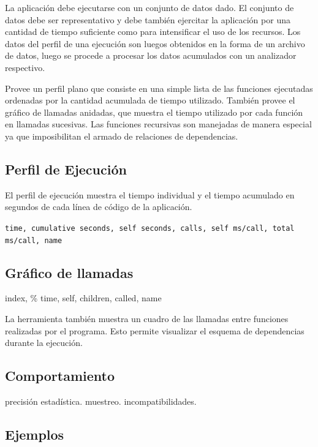 \documentclass[a4paper]{report}
\begin{document}
\bigskip

La aplicaci\'on debe ejecutarse con un conjunto de datos dado. El conjunto de
datos debe ser representativo y debe tambi\'en ejercitar la aplicaci\'on por
una cantidad de tiempo suficiente como para intensificar el uso de los
recursos. Los datos del perfil de una ejecuci\'on son luegos obtenidos en la
forma de un archivo de datos, luego se procede a procesar los datos acumulados
con un analizador respectivo.

\bigskip

Provee un perfil plano que consiste en una simple lista de las funciones
ejecutadas ordenadas por la cantidad acumulada de tiempo utilizado.
Tambi\'en provee el gr\'afico de llamadas anidadas, que muestra el tiempo
utilizado por cada funci\'on en llamadas sucesivas. Las funciones recursivas
son manejadas de manera especial ya que imposibilitan el armado de relaciones
de dependencias.

\subsection{Perfil de Ejecuci\'on}

El perfil de ejecuci\'on muestra el tiempo individual y el tiempo acumulado en segundos
de cada l\'inea de c\'odigo de la aplicaci\'on.

{\tt time, cumulative seconds, self seconds, calls, self ms/call,
  total ms/call, name}

\subsection{Gr\'afico de llamadas}

index, \% time, self, children, called, name

La herramienta tambi\'en muestra un cuadro de las llamadas entre funciones realizadas por el programa.
Esto permite visualizar el esquema de dependencias durante la ejecuci\'on.

\subsection{Comportamiento}

precisi\'on estad\'istica. muestreo. incompatibilidades.

\subsection{Ejemplos}
\end{document}
